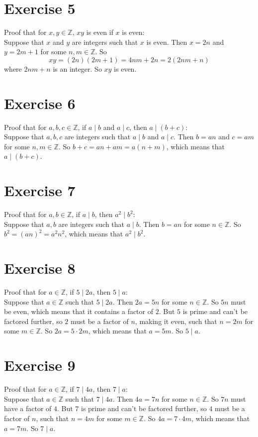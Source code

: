 \documentclass[12pt]{article}
\newcommand{\Z}{\mathbb{Z}}
\begin{document}
    \section*{Exercise 5}
    Proof that for $x, y \in \Z$,
    $xy$ is even if $x$ is even: \\
    Suppose that $x$ and $y$ are integers
    such that $x$ is even. 
    Then $x = 2n$ and $y = 2m+1$ for some $n, m \in \Z$.
    So 
    \[ xy = (2n)(2m+1) = 4nm + 2n = 2(2nm + n)\]
    where $2nm + n$ is an integer.
    So $xy$ is even. \\

    \section*{Exercise 6}
    Proof that for $a, b, c \in \Z$,
    if $a \mid b$ and $a \mid c$,
    then $a \mid (b+c)$: \\
    Suppose that $a, b, c$ are integers
    such that $a \mid b$ and $a \mid c$.
    Then $b = an$ and $c = am$ for some $n, m \in \Z$.
    So $b+c = an + am = a(n + m)$,
    which means that $a \mid (b+c)$. \\

    \section*{Exercise 7}
    Proof that for $a, b \in \Z$,
    if $a \mid b$,
    then $a^2 \mid b^2$: \\
    Suppose that $a, b$ are integers
    such that $a \mid b$.
    Then $b = an$ for some $n \in \Z$.
    So $b^2 = (an)^2 = a^2n^2$,
    which means that $a^2 \mid b^2$. \\

    \section*{Exercise 8}
    Proof that for $a \in \Z$,
    if $5 \mid 2a$,
    then $5 \mid a$: \\
    Suppose that $a \in \Z$
    such that $5 \mid 2a$.
    Then $2a = 5n$ for some $n \in \Z$.
    So $5n$ must be even,
    which means that it contains a factor of $2$.
    But $5$ is prime and can't be factored further,
    so $2$ must be a factor of $n$, making it even,
    such that $n = 2m$ for some $m \in \Z$.
    So $2a = 5 \cdot 2m$,
    which means that $a = 5m$.
    So $5 \mid a$. \\

    \section*{Exercise 9}
    Proof that for $a \in \Z$,
    if $7 \mid 4a$,
    then $7 \mid a$: \\
    Suppose that $a \in \Z$
    such that $7 \mid 4a$.
    Then $4a = 7n$ for some $n \in \Z$.
    So $7n$ must have a factor of $4$.
    But $7$ is prime and can't be factored further,
    so $4$ must be a factor of $n$,
    such that $n = 4m$ for some $m \in \Z$.
    So $4a = 7 \cdot 4m$,
    which means that $a = 7m$.
    So $7 \mid a$. \\
\end{document}
